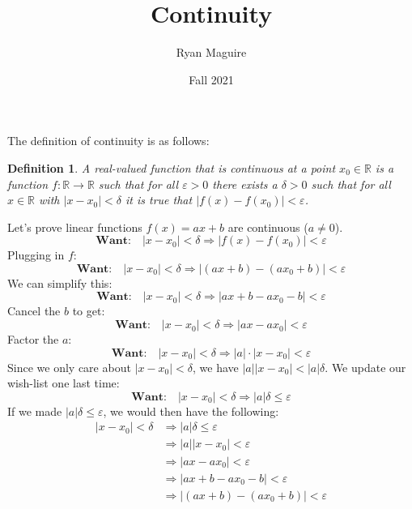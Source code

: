 \documentclass{article}
\title{Continuity}
\author{Ryan Maguire}
\date{Fall 2021}
\theoremstyle{normal}
\newtheorem{definition}{Definition}
\begin{document}
    \maketitle
    The definition of continuity is as follows:
    \begin{definition}
        A real-valued function that is continuous at a point
        $x_{0}\in\mathbb{R}$ is a function $f:\mathbb{R}\rightarrow\mathbb{R}$
        such that for all $\varepsilon>0$ there exists a $\delta>0$ such that
        for all $x\in\mathbb{R}$ with $|x-x_{0}|<\delta$ it is true that
        $|f(x)-f(x_{0})|<\varepsilon$.
    \end{definition}
    Let's prove linear functions $f(x)=ax+b$ are continuous ($a\ne{0}$).
    \begin{equation}
        \textbf{Want:}\quad
        |x-x_{0}|<\delta\Rightarrow
        |f(x)-f(x_{0})|<\varepsilon
    \end{equation}
    Plugging in $f$:
    \begin{equation}
        \textbf{Want:}\quad
        |x-x_{0}|<\delta
        \Rightarrow|(ax+b)-(ax_{0}+b)|<\varepsilon
    \end{equation}
    We can simplify this:
    \begin{equation}
        \textbf{Want:}\quad
        |x-x_{0}|<\delta
        \Rightarrow
        |ax+b-ax_{0}-b|<\varepsilon
    \end{equation}
    Cancel the $b$ to get:
    \begin{equation}
        \textbf{Want:}\quad
        |x-x_{0}|<\delta
        \Rightarrow
        |ax-ax_{0}|<\varepsilon
    \end{equation}
    Factor the $a$:
    \begin{equation}
        \textbf{Want:}\quad
        |x-x_{0}|<\delta
        \Rightarrow
        |a|\cdot|x-x_{0}|<\varepsilon
    \end{equation}
    Since we only care about $|x-x_{0}|<\delta$, we have
    $|a||x-x_{0}|<|a|\delta$. We update our wish-list one last time:
    \begin{equation}
        \textbf{Want:}\quad
        |x-x_{0}|<\delta
        \Rightarrow|a|\delta\leq\varepsilon
    \end{equation}
    If we made $|a|\delta\leq\varepsilon$, we would then have the following:
    \begin{align}
        |x-x_{0}|<\delta&\Rightarrow|a|\delta\leq\varepsilon\\
        &\Rightarrow|a||x-x_{0}|<\varepsilon\\
        &\Rightarrow|ax-ax_{0}|<\varepsilon\\
        &\Rightarrow|ax+b-ax_{0}-b|<\varepsilon\\
        &\Rightarrow|(ax+b)-(ax_{0}+b)|<\varepsilon
    \end{align}
\end{document}

